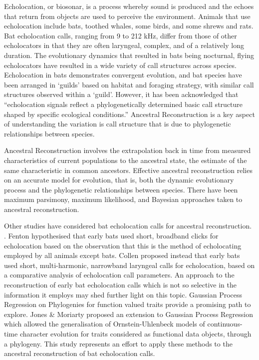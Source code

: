 \documentclass[wsdraft]{ws-rv9x6} %
\begin{document}
Echolocation, or biosonar, is a process whereby sound is produced and the echoes that return from objects are used to perceive the environment.\cite{jones2005echolocation} Animals that use echolocation include bats, toothed whales, some birds, and some shrews and rats.\cite{jones2005echolocation} Bat echolocation calls, ranging from 9 to 212 kHz, differ from those of other echolocators in that they are often laryngeal, complex, and of a relatively long duration.\cite{thomas2004echolocation} The evolutionary dynamics that resulted in bats being nocturnal, flying echolocators have resulted in a wide variety of call structures across species.\cite{jones2006evolution} Echolocation in bats demonstrates convergent evolution, and bat species have been arranged in `guilds' based on habitat and foraging strategy, with similar call structures observed within a `guild'. \cite{aldridge1987morphology} \cite{neuweiler1990auditory} \cite{schnitzler2001echolocation} However, it has been acknowledged that ``echolocation signals reflect a phylogenetically determined basic call structure shaped by specific ecological conditions.''\cite{schnitzler2004evolution} Ancestral Reconstruction is a key aspect of understanding the variation is call structure that is due to phylogenetic relationships between species. 

Ancestral Reconstruction involves the extrapolation back in time from measured characteristics of current populations to the ancestral state, the estimate of the same characteristic in common ancestors.\cite{joy2016ancestral} Effective ancestral reconstruction relies on an accurate model for evolution, that is, both the dynamic evolutionary process and the phylogenetic relationships between species. \cite{joy2016ancestral} There have been maximum parsimony\cite{fitch1971toward}, maximum likelihood\cite{pupko2000fast}, and Bayesian\cite{pagel2004bayesian} approaches taken to ancestral reconstruction.

Other studies have considered bat echolocation calls for ancestral reconstruction. \cite{fenton1995signal} \cite{collen2012evolution}. Fenton\cite{fenton1995signal} hypothesised that early bats used short, broadband clicks for echolocation based on the observation that this is the method of echolocating employed by all animals except bats. Collen\cite{collen2012evolution} proposed instead that early bats used short, multi-harmonic, narrowband laryngeal calls for echolocation, based on a comparative analysis of echolocation call parameters. An approach to the reconstruction of early bat echolocation calls which is not so selective in the information it employs may shed further light on this topic. Gaussian Process Regression on Phylogenies for function valued traits provide a promising path to explore.\cite{jones2013evolutionary} Jones \& Moriarty proposed an extension to Gaussian Process Regression\cite{rasmussen2006gaussian} which allowed the generalisation of Ornstein-Uhlenbeck\cite{uhlenbeck1930theory} models of continuous-time character evolution for traits considered as functional data objects,\cite{ramsay2006functional} through a phylogeny. This study represents an effort to apply these methods to the ancestral reconstruction of bat echolocation calls.
\end{document}
